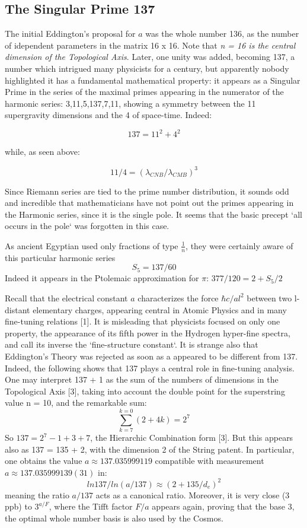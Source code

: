 \documentclass[twoside,draft]{article}
\begin{document}
\begin{sloppypar}
{\subsection{The Singular Prime 137}

The initial Eddington's proposal for $a$ was the whole number 136, as the number of idependent parameters in the matrix 16 x 16. Note that \textit{n = 16 is the central dimension of the Topological Axis}. Later, one unity was added, becoming 137, a number which intrigued many physicists for a century, but apparently nobody highlighted it has a fundamental mathematical property: it appears as a Singular Prime in the series of the maximal primes appearing in the numerator of the harmonic
series: 3,11,5,137,7,11, showing a symmetry between the 11 supergravity dimensions and the 4 of
space-time. Indeed:

$$137 = 11^{2} + 4^{2}$$

while, as seen above:

$$11/4 = (\lambda_{CNB}/\lambda_{CMB})^{3}$$

Since Riemann series are tied to the prime number distribution, it sounds odd and incredible that mathematicians
have not point out the primes appearing in the Harmonic series, since it is the single pole. It seems
that the basic precept `all occurs in the pole` was forgotten in this case. 

As ancient Egyptian used only fractions of type $\frac{1}{n}$, they were certainly aware of this particular harmonic series 
$$S_{5} = 137/60$$
Indeed it appears in the Ptolemaic approximation for $\pi$: $377/120 = 2 +  S_{5}/2$

Recall that the electrical constant $a$ characterizes the force $\hbar c/al^{2}$ between two l-distant
elementary charges, appearing central in Atomic Physics and in many fine-tuning relations [1]. It is
misleading that physicists focused on only one property, the appearance of its fifth power in the
Hydrogen hyper-fine spectra, and call its inverse the `fine-structure constant`. It is strange also that
Eddington's Theory was rejected as soon as a appeared to be different from 137. Indeed, the
following shows that 137 plays a central role in fine-tuning analysis. One may interpret 137 + 1 as
the sum of the numbers of dimensions in the Topological Axis [3], taking into account the double
point for the superstring value n = 10, and the remarkable sum:
\begin{equation}
\sum_{k=7}^{k=0}(2 + 4 k ) = 2^{7}
\end{equation}
So $137 = 2^{7} - 1 + 3 + 7$, the Hierarchic Combination form [3]. But this appears also as 137 = 135 + 2,
with the dimension 2 of the String patent. In particular, one obtains the value $a \approx 137.035999119$
compatible with measurement $a \approx 137.035999139(31)$ in:
\begin{equation}
ln137/ln(a/137) \approx (2+135/d_{e})^{2}
\end{equation}
meaning the ratio $a/137$ acts as a canonical ratio. Moreover, it is very close (3 ppb) to $3^{a/F}$, where the Tifft factor $F/a$ appears again, proving that the base 3, the optimal whole number basis is also used by the Cosmos.

}
\end{sloppypar}
\end{document}
